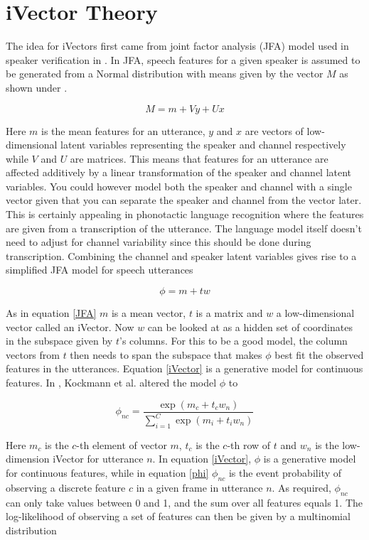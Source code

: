 \section{iVector Theory}
\label{theory}

The idea for iVectors first came from joint factor analysis (JFA) model used in speaker verification in \cite{oldiVector}. In JFA, speech features for a given speaker is assumed to be generated from a Normal distribution with means given by the vector $M$ as shown under \cite{oldiVector}.

\begin{equation}\label{JFA}
M=m+Vy+Ux
\end{equation}

Here $m$ is the mean features for an utterance, $y$ and $x$ are vectors of low-dimensional latent variables representing the speaker and channel respectively while $V$ and $U$ are matrices. This means that features for an utterance are affected additively by a linear transformation of the speaker and channel latent variables. You could however model both the speaker and channel with a single vector given that you can separate the speaker and channel from the vector later. This is certainly appealing in phonotactic language recognition where the features are given from a transcription of the utterance. The language model itself doesn't need to adjust for channel variability since this should be done during transcription. Combining the channel and speaker latent variables gives rise to a simplified JFA model for speech utterances

\begin{equation}\label{iVector}
\phi=m+tw
\end{equation}

As in equation \ref{JFA} $m$ is a mean vector, $t$ is a matrix and $w$ a low-dimensional vector called an iVector. Now $w$ can be looked at as a hidden set of coordinates in the subspace given by $t$'s columns. For this to be a good model, the column vectors from $t$ then needs to span the subspace that makes $\phi$ best fit the observed features in the utterances. Equation \ref{iVector} is a generative model for continuous features. In \cite{sviVector}, Kockmann et al. altered the model $\phi$ to

\begin{equation}\label{phi}
\phi_{nc}=\frac{\exp(m_c+t_cw_n)}{\sum_{i=1}^{C}\exp(m_i+t_iw_n)}
\end{equation}

Here $m_c$ is the $c$-th element of vector $m$, $t_c$ is the $c$-th row of $t$ and $w_n$ is the low-dimension iVector for utterance $n$. In equation \ref{iVector}, $\phi$ is a generative model for continuous features, while in equation \ref{phi} $\phi_{nc}$ is the event probability of observing a discrete feature $c$ in a given frame in utterance $n$. As required, $\phi_{nc}$ can only take values between 0 and 1, and the sum over all features equals 1. The log-likelihood of observing a set of features can then be given by a multinomial distribution

